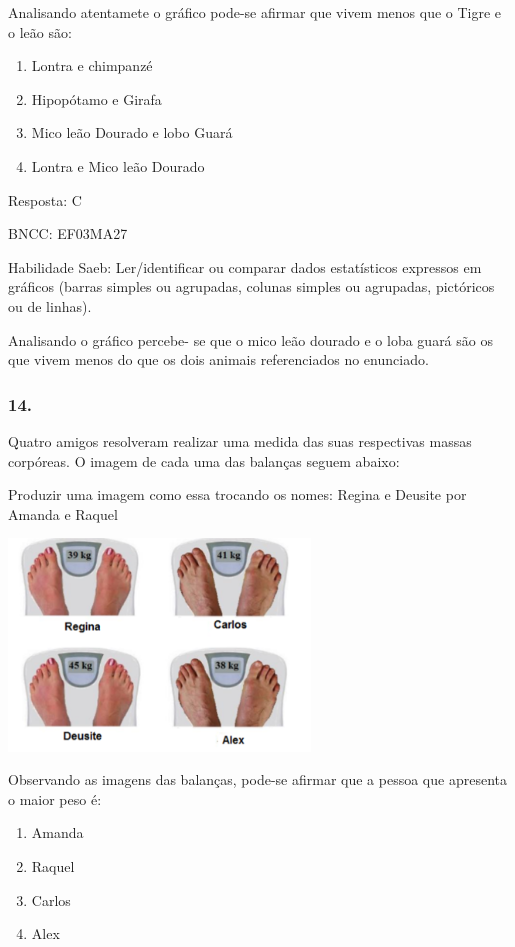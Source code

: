Analisando atentamete o gráfico pode-se afirmar que vivem menos que o
Tigre e o leão são:

\begin{enumerate}
\def\labelenumi{\alph{enumi})}
\item
  Lontra e chimpanzé
\item
  Hipopótamo e Girafa
\item
  Mico leão Dourado e lobo Guará
\item
  Lontra e Mico leão Dourado
\end{enumerate}

Resposta: C

BNCC: EF03MA27

Habilidade Saeb: Ler/identificar ou comparar dados estatísticos
expressos em gráficos (barras simples ou agrupadas, colunas simples ou
agrupadas, pictóricos ou de linhas).

Analisando o gráfico percebe- se que o mico leão dourado e o loba guará
são os que vivem menos do que os dois animais referenciados no
enunciado.

\subsubsection{14. }\label{section-169}

Quatro amigos resolveram realizar uma medida das suas respectivas massas
corpóreas. O imagem de cada uma das balanças seguem abaixo:

Produzir uma imagem como essa trocando os nomes: Regina e Deusite por
Amanda e Raquel

\includegraphics[width=3.15196in,height=2.22201in]{media/image128.png}

Observando as imagens das balanças, pode-se afirmar que a pessoa que
apresenta o maior peso é:

\begin{enumerate}
\def\labelenumi{\alph{enumi})}
\item
  Amanda
\item
  Raquel
\item
  Carlos
\item
  Alex
\end{enumerate}

